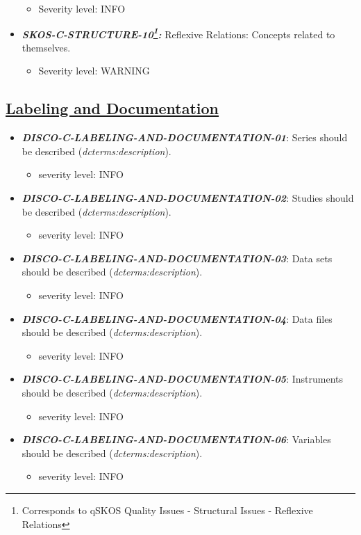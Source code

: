 \documentclass{llncs}
\begin{document}
\begin{itemize}
	\begin{itemize}
		\item Severity level: INFO
	\end{itemize}
	\item \textbf{{\em SKOS-C-STRUCTURE-10\footnote{Corresponds to qSKOS Quality Issues - Structural Issues - Reflexive Relations}:}}
	Reflexive Relations:
	Concepts related to themselves. 
	\begin{itemize}
		\item Severity level: WARNING
	\end{itemize}
\end{itemize}

\subsection{\underline{Labeling and Documentation}}

\begin{itemize}
	\item \textbf{{\em DISCO-C-LABELING-AND-DOCUMENTATION-01}}: 
	Series should be described (\emph{dcterms:description}).
	\begin{itemize}
		\item severity level: INFO
	\end{itemize}
	\item \textbf{{\em DISCO-C-LABELING-AND-DOCUMENTATION-02}}: 
	Studies should be described (\emph{dcterms:description}).
	\begin{itemize}
		\item severity level: INFO
	\end{itemize}
	\item \textbf{{\em DISCO-C-LABELING-AND-DOCUMENTATION-03}}: 
	Data sets should be described (\emph{dcterms:description}).
	\begin{itemize}
		\item severity level: INFO
	\end{itemize}
	\item \textbf{{\em DISCO-C-LABELING-AND-DOCUMENTATION-04}}: 
	Data files should be described (\emph{dcterms:description}).
	\begin{itemize}
		\item severity level: INFO
	\end{itemize}
	\item \textbf{{\em DISCO-C-LABELING-AND-DOCUMENTATION-05}}: 
	Instruments should be described (\emph{dcterms:description}).
	\begin{itemize}
		\item severity level: INFO
	\end{itemize}
	\item \textbf{{\em DISCO-C-LABELING-AND-DOCUMENTATION-06}}: 
	Variables should be described (\emph{dcterms:description}).
	\begin{itemize}
		\item severity level: INFO
	\end{itemize}
\end{itemize}
\end{document}
